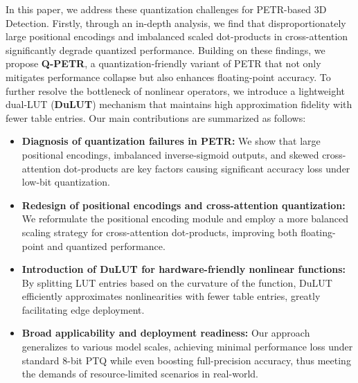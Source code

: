 In this paper, we address these quantization challenges for PETR-based 3D Detection. Firstly, through an in-depth analysis, we find that disproportionately large positional encodings and imbalanced scaled dot-products in cross-attention significantly degrade quantized performance. Building on these findings, we propose \textbf{Q-PETR}, a quantization-friendly variant of PETR that not only mitigates performance collapse but also enhances floating-point accuracy. To further resolve the bottleneck of nonlinear operators, we introduce a lightweight dual-LUT (\textbf{DuLUT}) mechanism that maintains high approximation fidelity with fewer table entries. Our main contributions are summarized as follows:
\begin{itemize}
    \item \textbf{Diagnosis of quantization failures in PETR:} We show that large positional encodings, imbalanced inverse-sigmoid outputs, and skewed cross-attention dot-products are key factors causing significant accuracy loss under low-bit quantization.
    \item \textbf{Redesign of positional encodings and cross-attention quantization:} We reformulate the positional encoding module and employ a more balanced scaling strategy for cross-attention dot-products, improving both floating-point and quantized performance.
    \item \textbf{Introduction of DuLUT for hardware-friendly nonlinear functions:} By splitting LUT entries based on the curvature of the function, DuLUT efficiently approximates nonlinearities with fewer table entries, greatly facilitating edge deployment.
    \item \textbf{Broad applicability and deployment readiness:} Our approach generalizes to various model scales, achieving minimal performance loss under standard 8-bit PTQ while even boosting full-precision accuracy, thus meeting the demands of resource-limited scenarios in real-world.
\end{itemize}




